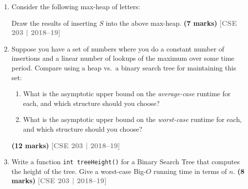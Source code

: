 \documentclass[12pt,a3paper]{article}
\newcommand{\yr}[1]{\hfill\textcolor{gray}{\small\textbf{[#1]}}}
\newcommand{\mk}[1]{\textcolor{orange!70!black}{\small\textbf{(#1 marks)}}}
\begin{document}
\begin{enumerate}
\item Consider the following max-heap of letters:

\begin{center}
\end{center}

Draw the results of inserting $S$ into the above max-heap. \mk{7}
\yr{CSE 203 | 2018--19}


\item Suppose you have a set of numbers where you do a constant number of insertions and a linear number of lookups of the maximum over some time period. Compare using a heap vs.\ a binary search tree for maintaining this set:
\begin{enumerate}
  \item What is the asymptotic upper bound on the \emph{average-case} runtime for each, and which structure should you choose?
  \item What is the asymptotic upper bound on the \emph{worst-case} runtime for each, and which structure should you choose?
\end{enumerate}
\mk{12}
\yr{CSE 203 | 2018--19}

\item Write a function \texttt{int treeHeight()} for a Binary Search Tree that computes the height of the tree. Give a worst-case Big-$O$ running time in terms of $n$. \mk{8}
\yr{CSE 203 | 2018--19}


\end{enumerate}
\end{document}
